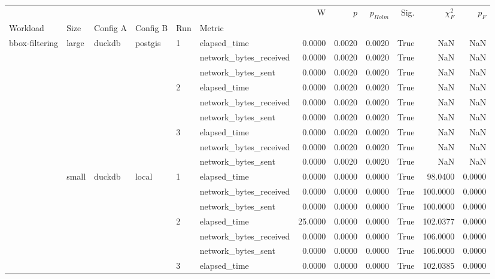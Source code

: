 \begin{tabular}{llllllrrrrrr}
\toprule
 &  &  &  &  &  & W & $p$ & $p_{Holm}$ & Sig. & $\chi^2_F$ & $p_F$ \\
Workload & Size & Config A & Config B & Run & Metric &  &  &  &  &  &  \\
\midrule
\multirow[t]{36}{*}{bbox-filtering} & \multirow[t]{9}{*}{large} & \multirow[t]{9}{*}{duckdb} & \multirow[t]{9}{*}{postgis} & \multirow[t]{3}{*}{1} & elapsed_time & 0.0000 & 0.0020 & 0.0020 & True & NaN & NaN \\
 &  &  &  &  & network_bytes_received & 0.0000 & 0.0020 & 0.0020 & True & NaN & NaN \\
 &  &  &  &  & network_bytes_sent & 0.0000 & 0.0020 & 0.0020 & True & NaN & NaN \\
\cline{5-12}
 &  &  &  & \multirow[t]{3}{*}{2} & elapsed_time & 0.0000 & 0.0020 & 0.0020 & True & NaN & NaN \\
 &  &  &  &  & network_bytes_received & 0.0000 & 0.0020 & 0.0020 & True & NaN & NaN \\
 &  &  &  &  & network_bytes_sent & 0.0000 & 0.0020 & 0.0020 & True & NaN & NaN \\
\cline{5-12}
 &  &  &  & \multirow[t]{3}{*}{3} & elapsed_time & 0.0000 & 0.0020 & 0.0020 & True & NaN & NaN \\
 &  &  &  &  & network_bytes_received & 0.0000 & 0.0020 & 0.0020 & True & NaN & NaN \\
 &  &  &  &  & network_bytes_sent & 0.0000 & 0.0020 & 0.0020 & True & NaN & NaN \\
\cline{2-12} \cline{3-12} \cline{4-12} \cline{5-12}
 & \multirow[t]{27}{*}{small} & \multirow[t]{18}{*}{duckdb} & \multirow[t]{9}{*}{local} & \multirow[t]{3}{*}{1} & elapsed_time & 0.0000 & 0.0000 & 0.0000 & True & 98.0400 & 0.0000 \\
 &  &  &  &  & network_bytes_received & 0.0000 & 0.0000 & 0.0000 & True & 100.0000 & 0.0000 \\
 &  &  &  &  & network_bytes_sent & 0.0000 & 0.0000 & 0.0000 & True & 100.0000 & 0.0000 \\
\cline{5-12}
 &  &  &  & \multirow[t]{3}{*}{2} & elapsed_time & 25.0000 & 0.0000 & 0.0000 & True & 102.0377 & 0.0000 \\
 &  &  &  &  & network_bytes_received & 0.0000 & 0.0000 & 0.0000 & True & 106.0000 & 0.0000 \\
 &  &  &  &  & network_bytes_sent & 0.0000 & 0.0000 & 0.0000 & True & 106.0000 & 0.0000 \\
\cline{5-12}
 &  &  &  & \multirow[t]{3}{*}{3} & elapsed_time & 0.0000 & 0.0000 & 0.0000 & True & 102.0385 & 0.0000 \\

\end{tabular}
